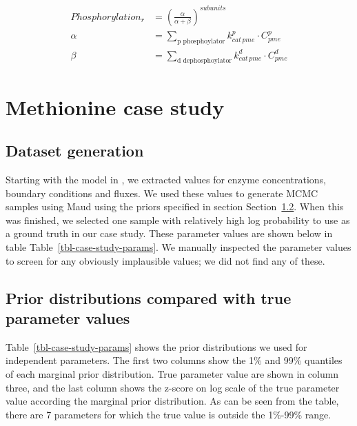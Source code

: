 \documentclass[journal=asbcd6,manuscript=article,layout=traditional]{achemso}
\begin{document}
\begin{align}
Phosphorylation_r &= (\frac{\alpha}{\alpha + \beta})^{subunits} \label{eq-phosphorylation}\\
\alpha &= \sum_{\text{p phosphoylator}} k_{cat\,pme}^{p} \cdot C_{pme}^p \nonumber \\
\beta &= \sum_{\text{d dephosphoylator}} k_{cat\,pme}^{d} \cdot C_{pme}^d \nonumber 
\end{align}

\hypertarget{sec-methionine-case-study}{%
\section{Methionine case study}\label{sec-methionine-case-study}}

\hypertarget{dataset-generation}{%
\subsection{Dataset generation}\label{dataset-generation}}

Starting with the model in \citet{saa_construction_2016}, we extracted
values for enzyme concentrations, boundary conditions and fluxes. We
used these values to generate MCMC samples using Maud using the priors
specified in section Section~\ref{sec-methionine-priors}. When this was
finished, we selected one sample with relatively high log probability to
use as a ground truth in our case study. These parameter values are
shown below in table Table~\ref{tbl-case-study-params}. We manually
inspected the parameter values to screen for any obviously implausible
values; we did not find any of these.

\hypertarget{sec-methionine-priors}{%
\subsection{Prior distributions compared with true parameter
values}\label{sec-methionine-priors}}

Table~\ref{tbl-case-study-params} shows the prior distributions we used
for independent parameters. The first two columns show the 1\% and 99\%
quantiles of each marginal prior distribution. True parameter value are
shown in column three, and the last column shows the z-score on log
scale of the true parameter value according the marginal prior
distribution. As can be seen from the table, there are 7 parameters for
which the true value is outside the 1\%-99\% range.
\end{document}
